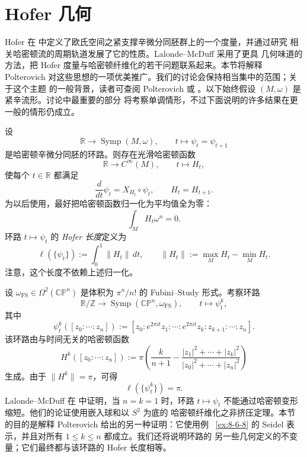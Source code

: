 
\section{Hofer 几何}\label{sec:9-6}

Hofer 在  中定义了欧氏空间之紧支撑辛微分同胚群上的一个度量，并通过研究
相关哈密顿流的周期轨道发展了它的性质。Lalonde--McDuff  采用了更具
几何味道的方法，把 Hofer 度量与哈密顿纤维化的若干问题联系起来。本节将解释
Polterovich 对这些思想的一项优美推广。我们的讨论会保持相当集中的范围；关于这个主题
的一般背景，读者可查阅 Polterovich  或
。以下始终假设 $(M,\omega)$ 是紧辛流形。讨论中最重要的部分
将考察单调情形，不过下面说明的许多结果在更一般的情形仍成立。

设
\[
  \mathbb R\longrightarrow\operatorname{Symp}(M,\omega),
  \qquad t\longmapsto\psi_t=\psi_{t+1}
\]
是哈密顿辛微分同胚的环路。则存在光滑哈密顿函数
\[
  \mathbb R\longrightarrow C^\infty(M),
  \qquad t\longmapsto H_t,
\]
使每个 $t\in\mathbb R$ 都满足
\[
  \frac d{dt}\psi_t=X_{H_t}\circ\psi_t,
  \qquad H_t=H_{t+1}.
\]
为以后使用，最好把哈密顿函数归一化为平均值全为零：
\[
  \int_M H_t\omega^n=0.
\]
环路 $t\mapsto\psi_t$ 的 \emph{Hofer 长度}定义为
\[
  \ell(\{\psi_t\}):=\int_0^1\|H_t\|\,dt,
  \qquad
  \|H_t\|:=\max_MH_t-\min_MH_t.
\]
注意，这个长度不依赖上述归一化。

\begin{example}\label{ex:9-6-1}
设 $\omega_{\mathrm{FS}}\in\Omega^2(\mathbb{CP}^n)$ 是体积为 $\pi^n/n!$ 的
Fubini--Study 形式。考察环路
\[
  \mathbb R/\mathbb Z\longrightarrow
  \operatorname{Symp}(\mathbb{CP}^n,\omega_{\mathrm{FS}}),
  \qquad t\longmapsto\psi_t^k,
\]
其中
\[
  \psi_t^k([z_0:\cdots:z_n])
  :=[z_0:e^{2\pi it}z_1:\cdots:e^{2\pi it}z_k:z_{k+1}:\cdots:z_n].
\]
该环路由与时间无关的哈密顿函数
\begin{equation}\label{eq:9-6-1}
  H^k([z_0:\cdots:z_n])
  :=\pi\left(
    \frac{k}{n+1}
    -\frac{|z_1|^2+\cdots+|z_k|^2}
      {|z_0|^2+\cdots+|z_n|^2}
  \right)
\end{equation}
生成。由于 $\|H^k\|=\pi$，可得
\[
  \ell(\{\psi_t^k\})=\pi.
\]
Lalonde--McDuff 在  中证明，当 $n=k=1$ 时，环路
$t\mapsto\psi_t$ 不能通过哈密顿变形缩短。他们的论证使用嵌入球和以 $S^2$ 为底的
哈密顿纤维化之非挤压定理。本节的目的是解释 Polterovich 给出的另一种证明：它使用例
~\ref{ex:8-6-8} 的 Seidel 表示，并且对所有 $1\le k\le n$ 都成立。我们还将说明环路的
另一些几何定义的不变量；它们最终都与该环路的 Hofer 长度相等。
\end{example}

